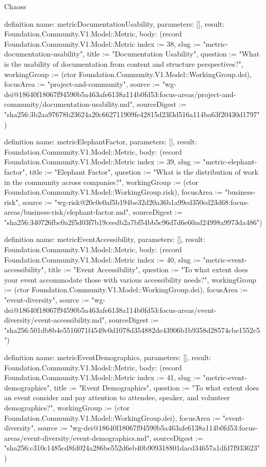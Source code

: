 \begin{lexlean}{Chaoss}
\begin{semanticmodule}
definition{
  name: metricDocumentationUsability,
  parameters: [],
  result: Foundation.Community.V1.Model::Metric,
  body: (record Foundation.Community.V1.Model::Metric {index := 38, slug := "metric-documentation-usability", title := "Documentation Usability", question := "What is the usability of documentation from content and structure perspectives?", workingGroup := (ctor Foundation.Community.V1.Model::WorkingGroup.dei), focusArea := "project-and-community", source := "wg-dei@18640f18067f94590b5a463afe6138a114b0fd53:focus-areas/project-and-community/documentation-usability.md", sourceDigest := "sha256:3b2aa97678b23624a20c662711909fe42815d23f3d516a114ba63f20430d1797"})
}

definition{
  name: metricElephantFactor,
  parameters: [],
  result: Foundation.Community.V1.Model::Metric,
  body: (record Foundation.Community.V1.Model::Metric {index := 39, slug := "metric-elephant-factor", title := "Elephant Factor", question := "What is the distribution of work in the community across companies?", workingGroup := (ctor Foundation.Community.V1.Model::WorkingGroup.risk), focusArea := "business-risk", source := "wg-risk@20c0e0af5b194be32d20a36b1a99ed350ed23d68:focus-areas/business-risk/elephant-factor.md", sourceDigest := "sha256:340726fbc0a2f5d03f7b19ceedb2a7bf54bb5c96d7d6e60ad24998a9973da486"})
}

definition{
  name: metricEventAccessibility,
  parameters: [],
  result: Foundation.Community.V1.Model::Metric,
  body: (record Foundation.Community.V1.Model::Metric {index := 40, slug := "metric-event-accessibility", title := "Event Accessibility", question := "To what extent does your event accommodate those with various accessibility needs?", workingGroup := (ctor Foundation.Community.V1.Model::WorkingGroup.dei), focusArea := "event-diversity", source := "wg-dei@18640f18067f94590b5a463afe6138a114b0fd53:focus-areas/event-diversity/event-accessibility.md", sourceDigest := "sha256:501db8b4e5516071f4549c0d1078d354882de43906b1b9358d28574cbe1552c5"})
}

definition{
  name: metricEventDemographics,
  parameters: [],
  result: Foundation.Community.V1.Model::Metric,
  body: (record Foundation.Community.V1.Model::Metric {index := 41, slug := "metric-event-demographics", title := "Event Demographics", question := "To what extent does an event consider and pay attention to attendee, speaker, and volunteer demographics?", workingGroup := (ctor Foundation.Community.V1.Model::WorkingGroup.dei), focusArea := "event-diversity", source := "wg-dei@18640f18067f94590b5a463afe6138a114b0fd53:focus-areas/event-diversity/event-demographics.md", sourceDigest := "sha256:c310c1485cd8fd024a286be552d6eb40b909318801dacd34657a1dfd7f933623"})
}


\end{semanticmodule}
\end{lexlean}
